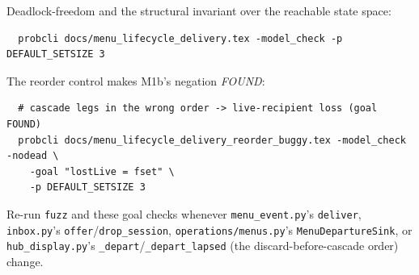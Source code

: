 \documentclass[a4paper,10pt,fleqn]{article}
\begin{document}
Deadlock-freedom and the structural invariant over the reachable state space:

\begin{verbatim}
  probcli docs/menu_lifecycle_delivery.tex -model_check -p DEFAULT_SETSIZE 3
\end{verbatim}

The reorder control makes M1b's negation \emph{FOUND}:

\begin{verbatim}
  # cascade legs in the wrong order -> live-recipient loss (goal FOUND)
  probcli docs/menu_lifecycle_delivery_reorder_buggy.tex -model_check -nodead \
    -goal "lostLive = fset" \
    -p DEFAULT_SETSIZE 3
\end{verbatim}

Re-run \texttt{fuzz} and these goal checks whenever
\texttt{menu\_event.py}'s \texttt{deliver}, \texttt{inbox.py}'s
\texttt{offer}/\texttt{drop\_session}, \texttt{operations/menus.py}'s
\texttt{MenuDepartureSink}, or \texttt{hub\_display.py}'s
\texttt{\_depart}/\texttt{\_depart\_lapsed} (the discard-before-cascade order)
change.
\end{document}
